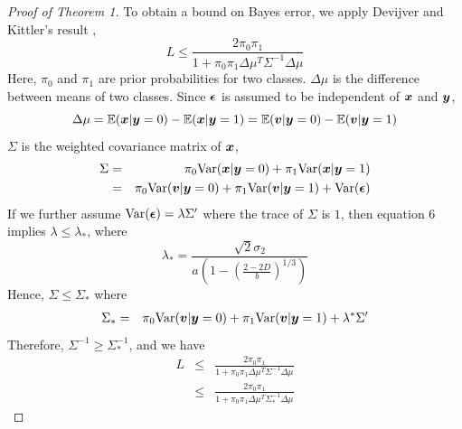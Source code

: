 \documentclass{article}
\begin{document}
\begin{proof}[Proof of Theorem 1]
	To obtain a bound on Bayes error, we apply Devijver and Kittler's result \cite{devijver1982pattern},
	\[L \leq \frac{2\pi_0\pi_1}{1+\pi_0\pi_1\Delta\mu^T\Sigma^{-1}\Delta\mu}\]
	Here, $\pi_0$ and $\pi_1$ are prior probabilities for two classes. $\Delta\mu$ is the difference between means of two classes. Since $\boldsymbol{\epsilon}$ is assumed to be independent of $\boldsymbol{x}$ and $\boldsymbol{y}$,
	\[\Delta\mu= \mathbb{E}(\boldsymbol{x}|\boldsymbol{y}=0)-\mathbb{E}(\boldsymbol{x}|\boldsymbol{y}=1)=\mathbb{E}(\boldsymbol{v}|\boldsymbol{y}=0)-\mathbb{E}(\boldsymbol{v}|\boldsymbol{y}=1)\]
	$\Sigma$ is the weighted covariance matrix of $\boldsymbol{x}$,
	\begin{eqnarray*}
		\Sigma &=& \pi_0\text{Var}(\boldsymbol{x}|\boldsymbol{y}=0)+\pi_1\text{Var}(\boldsymbol{x}|\boldsymbol{y}=1)\\
		&=& \pi_0\text{Var}(\boldsymbol{v}|\boldsymbol{y}=0)+\pi_1\text{Var}(\boldsymbol{v}|\boldsymbol{y}=1)+\text{Var}(\boldsymbol{\epsilon}) \\ 
	\end{eqnarray*}
	If we further assume $\text{Var}(\boldsymbol{\epsilon}) = \lambda \Sigma'$ where the trace of $\Sigma$ is $1$, then equation 6 implies $\lambda\leq\lambda_*$, where
	\[\lambda_*=\frac{\sqrt{2}\sigma_2}{a(1-(\frac{2-2D}{b})^{1/3} )}\]
	Hence, 	$\Sigma \leq \Sigma_*$ where
	\begin{eqnarray*}
		\Sigma_*&=& \pi_0\text{Var}(\boldsymbol{v}|\boldsymbol{y}=0)+\pi_1\text{Var}(\boldsymbol{v}|\boldsymbol{y}=1)+\lambda^*\Sigma'
	\end{eqnarray*}
	Therefore, $\Sigma^{-1} \geq \Sigma_*^{-1}$, and we have
	\begin{eqnarray*}
		L &\leq& \frac{2\pi_0\pi_1}{1+\pi_0\pi_1\Delta\mu^T\Sigma^{-1}\Delta\mu} \\
		&\leq& \frac{2\pi_0\pi_1}{1+\pi_0\pi_1\Delta\mu^T\Sigma_*^{-1}\Delta\mu}
	\end{eqnarray*}
\end{proof}
\end{document}

